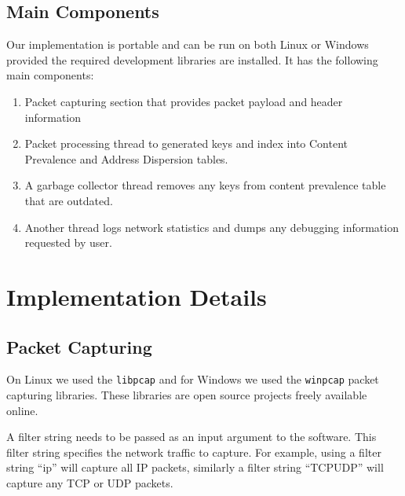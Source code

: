 \documentclass{report}
\begin{document}
\section{Main Components}
Our implementation is portable and can be run on both Linux or Windows provided the required development libraries are installed. It has the following main components:
\begin{enumerate}
\item Packet capturing section that provides packet payload and header information
\item Packet processing thread to generated keys and index into Content Prevalence and Address Dispersion tables.
\item A garbage collector thread removes any keys from content prevalence table that are outdated.
\item Another thread logs network statistics and dumps any debugging information requested by user.
\end{enumerate}

\chapter{Implementation Details}

\section{Packet Capturing}
On Linux we used the \texttt{libpcap} and for Windows we used the \texttt{winpcap} packet capturing libraries. These libraries are open source projects freely available online.

A filter string needs to be passed as an input argument to the software. This filter string specifies the network traffic to capture. For example, using a filter string ``ip'' will capture all IP packets, similarly a filter string ``TCP\textbar\textbar UDP'' will capture any TCP or UDP packets.

\nocite{*}

\end{document}
